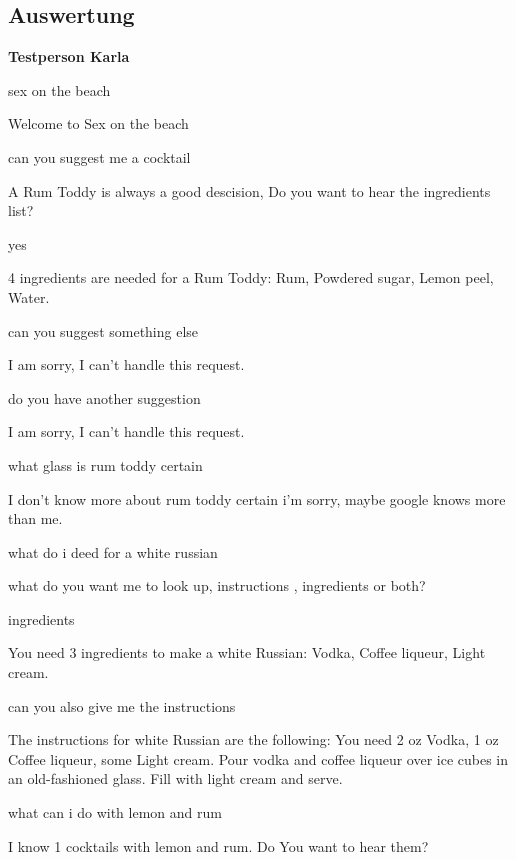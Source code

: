 \documentclass[12pt,letterpaper]{article}
\begin{document}
\subsection{Auswertung}
\textbf{Testperson Karla}
\begin{dialogue}
 sex on the beach

 Welcome to Sex on the beach

 can you suggest me a cocktail

 A Rum Toddy is always a good descision, Do you want to hear the ingredients list?

 yes

 4 ingredients are needed for a Rum Toddy: Rum, Powdered sugar, Lemon peel, Water.

 can you suggest something else

 I am sorry, I can't handle this request.\\

 do you have another suggestion

 I am sorry, I can't handle this request.

 what glass is rum toddy certain

 I don't know more about rum toddy certain i'm sorry, maybe google knows more than me.\\

 what do i deed for a white russian

 what do you want me to look up, instructions , ingredients or both?

 ingredients

 You need 3 ingredients to make a white Russian: Vodka, Coffee liqueur, Light cream.

 can you also give me the instructions

 The instructions for white Russian are the following: You need 2 oz Vodka, 1 oz Coffee liqueur, some Light cream. Pour vodka and coffee liqueur over ice cubes in an old-fashioned glass. Fill with light cream and serve.

 what can i do with lemon and rum

 I know 1 cocktails with lemon and rum. Do You want to hear them?


\end{dialogue}
\end{document}
